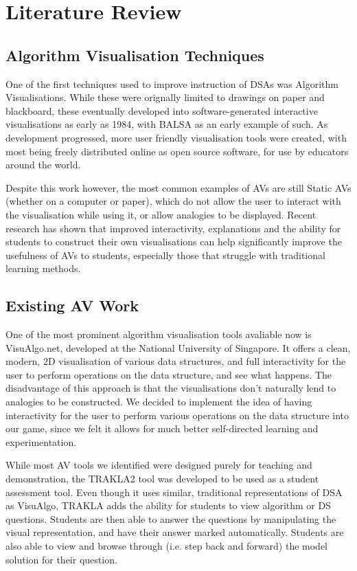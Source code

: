 \documentclass[10pt]{article}
\begin{document}
\section{Literature Review}
\subsection{Algorithm Visualisation Techniques}
One of the first techniques used to improve instruction of DSAs was Algorithm Visualisations. While these were orignally limited to drawings on paper and blackboard, these eventually developed into software-generated interactive visualisations as early as 1984, with BALSA\cite{Brown:1984:SAA:964965.808596} as an early example of such. As development progressed, more user friendly visualisation tools were created, with most being freely distributed online as open source software, for use by educators around the world.\par
Despite this work however, the most common examples of AVs are still Static AVs (whether on a computer or paper), which do not allow the user to interact with the visualisation while using it, or allow analogies to be displayed. Recent research has shown that improved interactivity, explanations\cite{vegh2} and the ability for students to construct their own visualisations can help significantly improve the usefulness of AVs to students, especially those that struggle with traditional learning methods\cite{Stasko:1993:AAA:169059.169078}.
\subsection{Existing AV Work}
One of the most prominent algorithm visualisation tools avaliable now is VisuAlgo.net\cite{visualgo}, developed at the National University of Singapore. It offers a clean, modern, 2D visualisation of various data structures, and full interactivity for the user to perform operations on the data structure, and see what happens. The disadvantage of this approach is that the visualisations don't naturally lend to analogies to be constructed. We decided to implement the idea of having interactivity for the user to perform various operations on the data structure into our game, since we felt it allows for much better self-directed learning and experimentation.\par
While most AV tools we identified were designed purely for teaching and demonstration, the TRAKLA2\cite{TRAKLA2} tool was developed to be used as a student assessment tool. Even though it uses similar, traditional representations of DSA as VisuAlgo, TRAKLA adds the ability for students to view algorithm or DS questions. Students are then able to answer the questions by manipulating the visual representation, and have their answer marked automatically. Students are also able to view and browse through (i.e. step back and forward) the model solution for their question.
\end{document}
